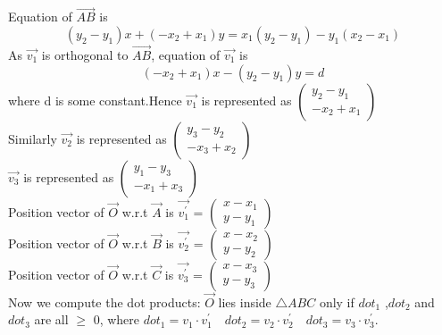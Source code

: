 \begin{enumerate}
Equation of $\vec{AB}$ is
\begin{equation}
(y_2-y_1)x + (-x_2+x_1)y = x_1(y_2-y_1) - y_1(x_2-x_1)
\end{equation}
As $\vec{v_1}$ is orthogonal to $\vec{AB}$, equation of $\vec{v_1}$ is
\begin{equation}
(-x_2+x_1)x - (y_2-y_1)y = d
\end{equation}
where d is some constant.Hence $\vec{v_1}$ is represented as $\begin{pmatrix}y_2-y_1\\-x_2+x_1\end{pmatrix}$\\
Similarly $\vec{v_2}$ is represented as $\begin{pmatrix}y_3-y_2\\-x_3+x_2\end{pmatrix}$\\
$\vec{v_3}$ is represented as $\begin{pmatrix}y_1-y_3\\-x_1+x_3\end{pmatrix}$\\
Position vector of $\vec{O}$ w.r.t $\vec{A}$ is $\vec{v_{1}^{'}}$ = $\begin{pmatrix}x-x_1\\y-y_1\end{pmatrix}$\\
Position vector of $\vec{O}$ w.r.t $\vec{B}$ is $\vec{v_{2}^{'}}$ = $\begin{pmatrix}x-x_2\\y-y_2\end{pmatrix}$\\
Position vector of $\vec{O}$ w.r.t $\vec{C}$ is $\vec{v_{3}^{'}}$ = $\begin{pmatrix}x-x_3\\y-y_3\end{pmatrix}$\\
Now we compute the dot products: $\vec{O}$ lies inside $\triangle ABC$ only if $dot_1$ ,$dot_2$ and $dot_3$ are all $\geqslant$ 0, where $dot_1 = v_1 \cdot v_{1}^{'} \quad dot_2 = v_2 \cdot v_{2}^{'} \quad dot_3 = v_3 \cdot v_{3}^{'}$.






      


\end{enumerate}
